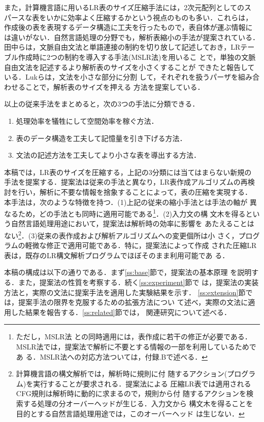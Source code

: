 また，計算機言語に用いるLR表のサイズ圧縮手法には，2次元配列としてのス
パースな表をいかに効率よく圧縮するかという視点のものも多い．これらは，
作成後の表を表現するデータ構造に工夫を行ったもので，表自体が運ぶ情報に
は違いがない．自然言語処理の分野でも，解析表縮小の手法が提案されている．
田中らは，文脈自由文法と単語連接の制約を切り放して記述しておき，LRテー
ブル作成時に2つの制約を導入する手法(MSLR法)\cite{tanaka1995}を用いるこ
とで，単独の文脈自由文法を記述するより解析表のサイズを小さくすることが
できたと報告している\cite{tanaka1997}．Lukらは，文法を小さな部分に分割
して，それぞれを扱うパーザを組み合わせることで，解析表のサイズを押える
方法を提案している\cite{luk2000}．

以上の従来手法をまとめると，次の3つの手法に分類できる．
\begin{enumerate}
\item 処理効率を犠牲にして空間効率を稼ぐ方法．
\item 表のデータ構造を工夫して記憶量を引き下げる方法．
\item 文法の記述方法を工夫してより小さな表を導出する方法．
\end{enumerate}

本稿では，LR表のサイズを圧縮する，上記の3分類には当てはまらない新規の
手法を提案する．提案法は従来の手法と異なり，LR表作成アルゴリズムの再検
討を行い，解析に不要な情報を捨象することによって，表の圧縮を実現する．
本手法は，次のような特徴を持つ．(1)上記の従来の縮小手法とは手法の軸が
異なるため，どの手法とも同時に適用可能である\footnote{ただし，MSLR法
  \cite{tanaka1995}との同時適用には，表作成に若干の修正が必要である．
  MSLR法では，提案法で解析に不要とする情報の一部を利用しているためであ
  る．MSLR法への対応方法ついては，付録.Bで述べる．}．(2)入力文の構
文木を得るという自然言語処理用途において，提案法は解析時の効率に影響を
あたえることはない\footnote{計算機言語の構文解析では，解析時に規則に付
  随するアクション(プログラム)を実行することが要求される．提案法による
  圧縮LR表では適用されるCFG規則は解析時に動的に求まるので，規則から付
  随するアクションを検索する処理の分オーバーヘッドが生じる．入力文から
  構文木を得ることを目的とする自然言語処理用途では，このオーバーヘッド
  は生じない．}．(3)従来の表作成および解析アルゴリズムへの変更個所は小
さく，プログラムの軽微な修正で適用可能である．特に，提案法によって作成
された圧縮LR表は，既存のLR構文解析プログラムでほぼそのまま利用可能であ
る．

本稿の構成は以下の通りである．まず\ref{ss:base}節で，提案法の基本原理
を説明する．また，提案法の性質を考察する．続く\ref{ss:experiment}節で
は，提案法の実装方法と，実際の文法に提案手法を適用した実験結果を示す．
\ref{ss:extension}節では，提案手法の限界を克服するための拡張方法につい
て述べ，実際の文法に適用した結果を報告する．\ref{ss:related}節では，
関連研究について述べる．


